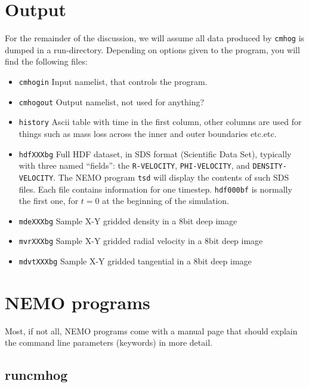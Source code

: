 \documentclass[11pt]{article}
\begin{document}
\section{Output}

For the remainder of the discussion, we will assume all data produced
by {\tt cmhog} is dumped in a run-directory. 
Depending on options given to the program, you will find the following files:

\begin{itemize}

\item
{\tt cmhogin}
Input namelist, that controls the program.

\item
{\tt cmhogout}
Output namelist, not used for anything?

\item
{\tt history}
Ascii table with time in the first column, other columns 
are used for things such as mass loss across the inner and 
outer boundaries etc.etc.

\item
{\tt hdfXXXbg}
Full HDF dataset, in SDS format (Scientific Data Set), typically
with three named ``fields'': the 
{\tt R-VELOCITY}, {\tt PHI-VELOCITY}, and {\tt DENSITY-VELOCITY}.
The NEMO program {\tt tsd} will display the contents of
such SDS files. Each file contains information for one timestep.
{\tt hdf000bf} is normally the first one, for $t=0$ at the beginning
of the simulation.

\item
{\tt mdeXXXbg}
Sample X-Y gridded density in a 8bit deep image

\item
{\tt mvrXXXbg}
Sample X-Y gridded radial velocity in a 8bit deep image

\item
{\tt mdvtXXXbg}
Sample X-Y gridded tangential in a 8bit deep image

\end{itemize}

\section{NEMO programs}

Most, if not all, NEMO programs come with a manual page that should
explain the command line parameters (keywords) in more detail.

\subsection{runcmhog}
\end{document}
